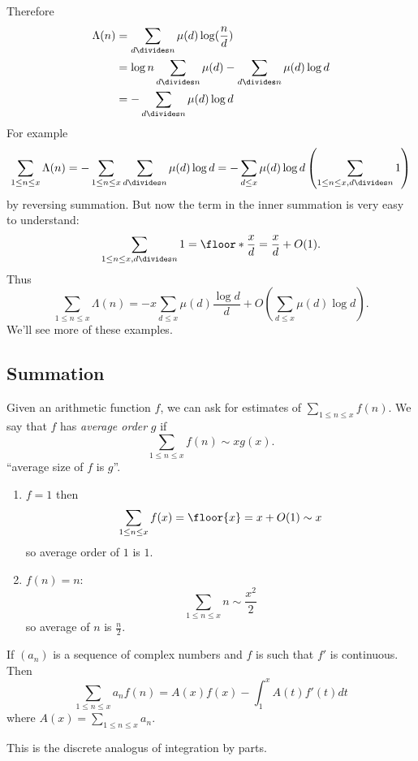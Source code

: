 \documentclass[a4paper]{article}
\theoremstyle{definition}
\begin{document}
Therefore
\begin{align*}
  \Lambda(n)
  &= \sum_{d \divides n} \mu(d) \log(\frac{n}{d}) \\
  &= \log n \sum_{d \divides n} \mu(d) - \sum_{d \divides n} \mu(d) \log d \\
  &= - \sum_{d \divides n} \mu(d) \log d
\end{align*}
For example
\[
  \sum_{1 \leq n \leq x} \Lambda(n)
  = - \sum_{1 \leq n \leq x} \sum_{d \divides n} \mu(d) \log d
  = - \sum_{d \leq x} \mu(d) \log d \left(\sum_{1 \leq n \leq x, d \divides n} 1\right)
\]
by reversing summation. But now the term in the inner summation is very easy to understand:
\[
  \sum_{1 \leq n \leq x, d \divides n} 1 = \floor*{\frac{x}{d}} = \frac{x}{d} + O(1).
\]
Thus
\[
  \sum_{1 \leq n \leq x} \Lambda(n)
  = -x \sum_{d \leq x} \mu(d) \frac{\log d}{d} + O\left(\sum_{d \leq x} \mu(d) \log d\right).
\]
We'll see more of these examples.

\subsection{Summation}

Given an arithmetic function \(f\), we can ask for estimates of \(\sum_{1 \leq n \leq x} f(n)\). We say that \(f\) has \emph{average order} \(g\) if
\[
  \sum_{1 \leq n \leq x} f(n) \sim x g(x).
\]
``average size of \(f\) is \(g\)''.

\begin{eg}\leavevmode
  \begin{enumerate}
  \item \(f = 1\) then
    \[
      \sum_{1 \leq n \leq x} f(x) = \floor{x} = x + O(1) \sim x
    \]
    so average order of \(1\) is \(1\).
  \item \(f(n) = n\):
    \[
      \sum_{1 \leq n \leq x} n \sim \frac{x^2}{2}
    \]
    so average of \(n\) is \(\frac{n}{2}\).
  \end{enumerate}
\end{eg}

\begin{lemma}
  If \((a_n)\) is a sequence of complex numbers and \(f\) is such that \(f'\) is continuous. Then
  \[
    \sum_{1 \leq n \leq x} a_n f(n) = A(x) f(x) - \int_1^x A(t)f'(t) dt
  \]
  where \(A(x) = \sum_{1 \leq n \leq x} a_n\).
\end{lemma}

This is the discrete analogus of integration by parts.
\end{document}
